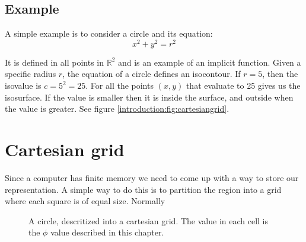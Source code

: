 
\subsection{Example}

A simple example is to consider a circle and its equation:
\begin{equation*} 
  x^{2} + y^{2} = r^{2}
\end{equation*}

It is defined in all points in $\mathbb{R}^{2}$ and is an example of
an implicit function. Given a specific radius $r$, the equation of a
circle defines an isocontour. If $r = 5$, then the isovalue is $c =
5^{2} = 25$. For all the points $(x,y)$ that evaluate to 25 gives us
the isosurface. If the value is smaller then it is inside the surface,
and outside when the value is greater. See figure
\vref{introduction:fig:cartesiangrid}.



\section{Cartesian grid}

\begin{comment} Finite memory -> descritization of plane -> cartesian
grid is used.
\end{comment}

Since a computer has finite memory we need to come up with a way to
store our representation. A simple way to do this is to partition the region into a grid where each
square is of equal size. Normally

\begin{figure}[htb] \centering
  \caption{A circle, descritized into a cartesian grid. The value in
    each cell is the $\phi$ value described in this chapter.}
  \label{introduction:fig:cartesiangrid}
\end{figure}

